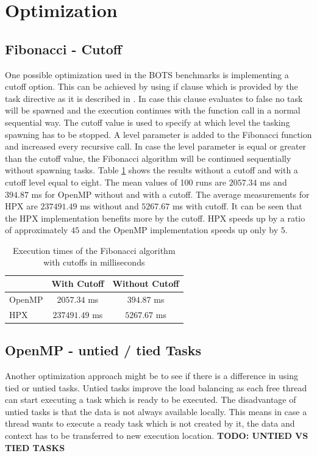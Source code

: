 \section{Optimization}
\subsection{Fibonacci - Cutoff}
  One possible optimization used in the BOTS benchmarks is implementing a cutoff option.
  This can be achieved by using if clause which is provided by the task directive as it is described in \cite{MKlemm.2018}.
  In case this clause evaluates to false no task will be spawned and the execution continues with the function call in a normal sequential way.
  The cutoff value is used to specify at which level the tasking spawning has to be stopped.
  A level parameter is added to the Fibonacci function and increased every recursive call.
  In case the level parameter is equal or greater than the cutoff value, the Fibonacci algorithm will be continued sequentially without spawning tasks. 
  Table \ref{tab:cutoff} shows the results without a cutoff and with a cutoff level equal to eight.
  The mean values of 100 runs are \(2057.34\) ms and \(394.87\) ms for OpenMP without and with a cutoff.
The average measurements for HPX are \(237491.49\) ms without and \(5267.67\) ms with cutoff.
It can be seen that the HPX implementation benefits more by the cutoff.
HPX speeds up by a ratio of approximately \(45\) and the OpenMP implementation speeds up only by \(5\).

\begin{table}
\centering
\caption{Execution times of the Fibonacci algorithm with cutoffs in milliseconds}
\begin{tabular}[h]{|l|c|c|}
\hline
 & With Cutoff & Without Cutoff \\\hline
OpenMP & \(2057.34\) ms & \(394.87\) ms \\\hline
HPX & \(237491.49\) ms & \(5267.67\) ms \\\hline
\end{tabular}
\label{tab:cutoff}
\end{table}

\subsection{OpenMP - untied / tied Tasks}
  Another optimization approach might be to see if there is a difference in using tied or untied tasks.
  Untied tasks improve the load balancing as each free thread can start executing a task which is ready to be executed.
  The disadvantage of untied tasks is that the data is not always available locally.
  This means in case a thread wants to execute a ready task which is not created by it, the data and context has to be transferred to new execution location.
  \textbf{TODO: UNTIED VS TIED TASKS}	
  
